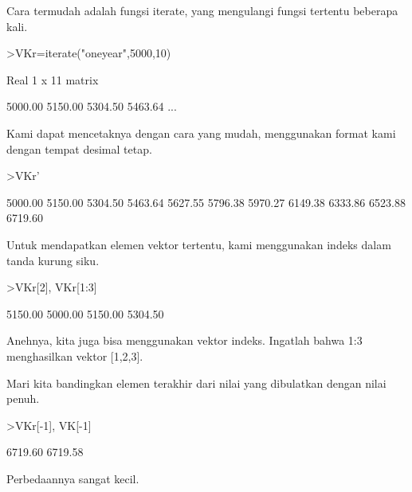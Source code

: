 \documentclass{article}
\begin{document}
\begin{eulernotebook}
\begin{eulercomment}
\begin{eulercomment}
\begin{eulercomment}
\begin{eulercomment}
\begin{eulercomment}
\begin{eulercomment}
\begin{eulercomment}
\begin{eulercomment}
\begin{eulercomment}
Cara termudah adalah fungsi iterate, yang mengulangi fungsi tertentu
beberapa kali.
\end{eulercomment}
\begin{eulerprompt}
>VKr=iterate("oneyear",5000,10)
\end{eulerprompt}
\begin{euleroutput}
  Real 1 x 11 matrix
  
      5000.00     5150.00     5304.50     5463.64     ...
\end{euleroutput}
\begin{eulercomment}
Kami dapat mencetaknya dengan cara yang mudah, menggunakan format kami
dengan tempat desimal tetap.
\end{eulercomment}
\begin{eulerprompt}
>VKr'
\end{eulerprompt}
\begin{euleroutput}
      5000.00 
      5150.00 
      5304.50 
      5463.64 
      5627.55 
      5796.38 
      5970.27 
      6149.38 
      6333.86 
      6523.88 
      6719.60 
\end{euleroutput}
\begin{eulercomment}
Untuk mendapatkan elemen vektor tertentu, kami menggunakan indeks
dalam tanda kurung siku.
\end{eulercomment}
\begin{eulerprompt}
>VKr[2], VKr[1:3]
\end{eulerprompt}
\begin{euleroutput}
      5150.00 
      5000.00     5150.00     5304.50 
\end{euleroutput}
\begin{eulercomment}
Anehnya, kita juga bisa menggunakan vektor indeks. Ingatlah bahwa 1:3
menghasilkan vektor [1,2,3].

Mari kita bandingkan elemen terakhir dari nilai yang dibulatkan dengan
nilai penuh.
\end{eulercomment}
\begin{eulerprompt}
>VKr[-1], VK[-1]
\end{eulerprompt}
\begin{euleroutput}
      6719.60 
      6719.58 
\end{euleroutput}
\begin{eulercomment}
Perbedaannya sangat kecil.


\end{eulercomment}
\end{eulercomment}
\end{eulercomment}
\end{eulercomment}
\end{eulercomment}
\end{eulercomment}
\end{eulercomment}
\end{eulercomment}
\end{eulercomment}
\end{eulernotebook}
\end{document}

